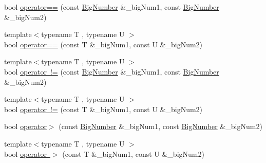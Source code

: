 \textbf{ }\par
\begin{DoxyCompactItemize}
\item 
bool \mbox{\hyperlink{class_big_nums_1_1_big_number_a895aa35eca34f84db8c543f23274040a}{operator==}} (const \mbox{\hyperlink{class_big_nums_1_1_big_number}{Big\+Number}} \&\+\_\+big\+Num1, const \mbox{\hyperlink{class_big_nums_1_1_big_number}{Big\+Number}} \&\+\_\+big\+Num2)
\item 
{\footnotesize template$<$typename T , typename U $>$ }\\bool \mbox{\hyperlink{class_big_nums_1_1_big_number_add1b48504a6361ebffcef3c2b9fb5958}{operator==}} (const T \&\+\_\+big\+Num1, const U \&\+\_\+big\+Num2)
\end{DoxyCompactItemize}

\textbf{ }\par
\begin{DoxyCompactItemize}
\item 
{\footnotesize template$<$typename T , typename U $>$ }\\bool \mbox{\hyperlink{class_big_nums_1_1_big_number_a7311ab2265ec5536725ffdc2dcfb7dcb}{operator !=}} (const \mbox{\hyperlink{class_big_nums_1_1_big_number}{Big\+Number}} \&\+\_\+big\+Num1, const \mbox{\hyperlink{class_big_nums_1_1_big_number}{Big\+Number}} \&\+\_\+big\+Num2)
\item 
{\footnotesize template$<$typename T , typename U $>$ }\\bool \mbox{\hyperlink{class_big_nums_1_1_big_number_a06943b4fe9e60b40857108c3d1a40c4b}{operator !=}} (const T \&\+\_\+big\+Num1, const U \&\+\_\+big\+Num2)
\end{DoxyCompactItemize}

\textbf{ }\par
\begin{DoxyCompactItemize}
\item 
bool \mbox{\hyperlink{class_big_nums_1_1_big_number_a73fd242189f8c8439d4f001681d1ae51}{operator$>$}} (const \mbox{\hyperlink{class_big_nums_1_1_big_number}{Big\+Number}} \&\+\_\+big\+Num1, const \mbox{\hyperlink{class_big_nums_1_1_big_number}{Big\+Number}} \&\+\_\+big\+Num2)
\item 
{\footnotesize template$<$typename T , typename U $>$ }\\bool \mbox{\hyperlink{class_big_nums_1_1_big_number_a2333d6e7a2438bcea0672fb4dbfc7b91}{operator $>$}} (const T \&\+\_\+big\+Num1, const U \&\+\_\+big\+Num2)
\end{DoxyCompactItemize}

